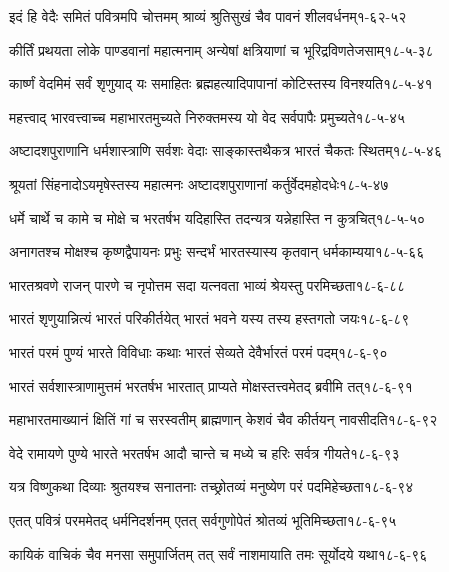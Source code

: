 \annotwolineshloka
{इदं हि वेदैः समितं पवित्रमपि चोत्तमम्}
{श्राव्यं श्रुतिसुखं चैव पावनं शीलवर्धनम्}{१-६२-५२}


\annotwolineshloka
{कीर्तिं प्रथयता लोके पाण्डवानां महात्मनाम्}
{अन्येषां क्षत्रियाणां च भूरिद्रविणतेजसाम्}{१८-५-३८}

\annotwolineshloka
{कार्ष्णं वेदमिमं सर्वं शृणुयाद् यः समाहितः}
{ब्रह्महत्यादिपापानां कोटिस्तस्य विनश्यति}{१८-५-४१}

\annotwolineshloka
{महत्त्वाद् भारवत्त्वाच्च महाभारतमुच्यते}
{निरुक्तमस्य यो वेद सर्वपापैः प्रमुच्यते}{१८-५-४५}

\annotwolineshloka
{अष्टादशपुराणानि धर्मशास्त्राणि सर्वशः}
{वेदाः साङ्कास्तथैकत्र भारतं चैकतः स्थितम्}{१८-५-४६}

\annotwolineshloka
{श्रूयतां सिंहनादोऽयमृषेस्तस्य महात्मनः}
{अष्टादशपुराणानां कर्तुर्वेदमहोदधेः}{१८-५-४७}

\annotwolineshloka
{धर्मे चार्थे च कामे च मोक्षे च भरतर्षभ}
{यदिहास्ति तदन्यत्र यन्नेहास्ति न कुत्रचित्}{१८-५-५०}

\annotwolineshloka
{अनागतश्च मोक्षश्च कृष्णद्वैपायनः प्रभुः}
{सन्दर्भं भारतस्यास्य कृतवान् धर्मकाम्यया}{१८-५-६६}

\annotwolineshloka
{भारतश्रवणे राजन् पारणे च नृपोत्तम}
{सदा यत्नवता भाव्यं श्रेयस्तु परमिच्छता}{१८-६-८८}

\annotwolineshloka
{भारतं शृणुयान्नित्यं भारतं परिकीर्तयेत्}
{भारतं भवने यस्य तस्य हस्तगतो जयः}{१८-६-८९}

\annotwolineshloka
{भारतं परमं पुण्यं भारते विविधाः कथाः}
{भारतं सेव्यते देवैर्भारतं परमं पदम्}{१८-६-९०}

\annotwolineshloka
{भारतं सर्वशास्त्राणामुत्तमं भरतर्षभ}
{भारतात् प्राप्यते मोक्षस्तत्त्वमेतद् ब्रवीमि तत्}{१८-६-९१}

\annotwolineshloka
{महाभारतमाख्यानं क्षितिं गां च सरस्वतीम्}
{ब्राह्मणान् केशवं चैव कीर्तयन् नावसीदति}{१८-६-९२}

\annotwolineshloka
{वेदे रामायणे पुण्ये भारते भरतर्षभ}
{आदौ चान्ते च मध्ये च हरिः सर्वत्र गीयते}{१८-६-९३}

\annotwolineshloka
{यत्र विष्णुकथा दिव्याः श्रुतयश्च सनातनाः}
{तच्छ्रोतव्यं मनुष्येण परं पदमिहेच्छता}{१८-६-९४}

\annotwolineshloka
{एतत् पवित्रं परममेतद् धर्मनिदर्शनम्}
{एतत् सर्वगुणोपेतं श्रोतव्यं भूतिमिच्छता}{१८-६-९५}

\annotwolineshloka
{कायिकं वाचिकं चैव मनसा समुपार्जितम्}
{तत् सर्वं नाशमायाति तमः सूर्योदये यथा}{१८-६-९६}

